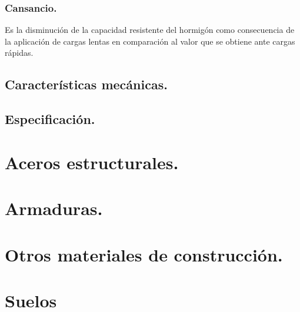 \subsubsection{Cansancio.}
Es la disminución de la capacidad resistente del hormigón como consecuencia de la aplicación de cargas lentas en comparación al valor que se obtiene ante cargas rápidas.

\subsection{Características mecánicas.}

\subsection{Especificación.}

\section{Aceros estructurales.}

\section{Armaduras.}

\section{Otros materiales de construcción.}

\section{Suelos}
